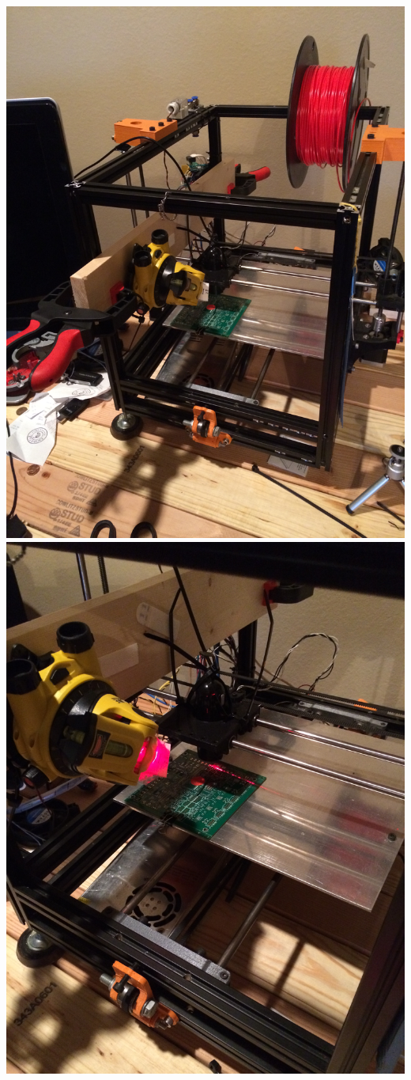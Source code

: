 \documentclass[12pt]{article}
\begin{document}
\includegraphics[scale=0.1,angle=270]{images/volume_analysis_setup/IMG_0604.JPG}
\newpage
\includegraphics[scale=0.1,angle=270]{images/volume_analysis_setup/IMG_0605.JPG}
\end{document}
